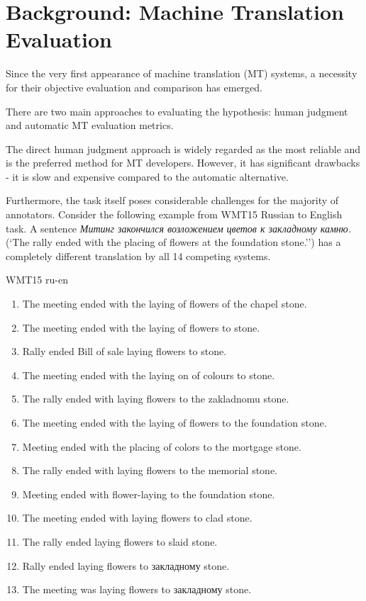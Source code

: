 \chapter{Background: Machine Translation Evaluation}

Since the very first appearance of machine translation (MT) systems, a necessity for their objective evaluation and comparison has emerged.

There are two main approaches to evaluating the hypothesis: human judgment and automatic MT evaluation metrics.

The direct human judgment approach is widely regarded as the most reliable and is the preferred method for MT developers. However, it has significant drawbacks - it is slow and expensive compared to the automatic alternative.

Furthermore, the task itself poses considerable challenges for the majority of annotators. Consider the following example from WMT15 \cite{wmt15} Russian to English task. A sentence \textit{Митинг закончился возложением цветов к закладному камню.} (`The rally ended with the placing of flowers at the foundation stone.'') has a completely different translation by all 14 competing systems.   

WMT15 ru-en
\begin{enumerate}
\item The meeting ended with the laying of flowers of the chapel stone.
\item The meeting ended with the laying of flowers to stone.
\item Rally ended Bill of sale laying flowers to stone.
\item The meeting ended with the laying on of colours to stone.
\item The rally ended with laying flowers to the zakladnomu stone.
\item The meeting ended with the laying of flowers to the foundation stone.
\item Meeting ended with the placing of colors to the mortgage stone.
\item The rally ended with laying flowers to the memorial stone.
\item Meeting ended with flower-laying to the foundation stone.
\item The meeting ended with laying flowers to clad stone.
\item The rally ended laying flowers to slaid stone.
\item Rally ended laying flowers to закладному stone.
\item The meeting was laying flowers to закладному stone.
\end{enumerate}

